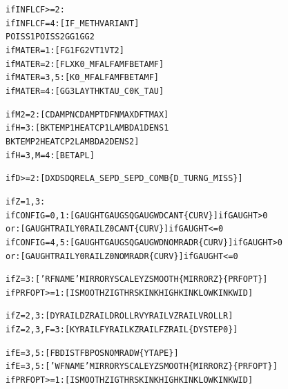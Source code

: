 \documentclass[12pt]{report}
\renewcommand{\magenta}[1]{}
\begin{document}
\begin{alltt}

if INFLCF>=2:
      if INFLCF=4:   [ IF\_METH  VARIANT               ]
                       POISS1  POISS2  GG1     GG2
\magenta{      if BOUND =1:   [ FLXZ                           ]
}      if MATER =1:   [ FG1     FG2       VT1     VT2  ]
      if MATER =2:   [ FLX     K0\_MF   ALFAMF  BETAMF ]
      if MATER =3,5: [         K0\_MF   ALFAMF  BETAMF ]
      if MATER =4:   [ GG3     LAYTHK  TAU\_C0  K\_TAU  ]


if M2=2:     [ CDAMPN   CDAMPT   DFNMAX   DFTMAX   ]
\magenta{if M3=2:     [ UTHRS    LPOW0    LPOW1           ]
}if H=3:      [ BKTEMP1  HEATCP1  LAMBDA1  DENS1           
               BKTEMP2  HEATCP2  LAMBDA2  DENS2    ]
if H=3, M=4: [ BETAPL                              ]


if D>=2:     [ DX    DS   DQREL   A\_SEP   D\_SEP   D\_COMB  \{D\_TURN   G\_MISS\} ]


if Z=1,3:
   if CONFIG=0,1:  [  GAUGHT   GAUGSQ   GAUGWD   CANT     \{CURV\} ]  if GAUGHT >  0
              or:  [  GAUGHT   RAILY0   RAILZ0   CANT     \{CURV\} ]  if GAUGHT <= 0
   if CONFIG=4,5:  [  GAUGHT   GAUGSQ   GAUGWD   NOMRADR  \{CURV\} ]  if GAUGHT >  0
              or:  [  GAUGHT   RAILY0   RAILZ0   NOMRADR  \{CURV\} ]  if GAUGHT <= 0

if Z=3:        [ 'RFNAME'  MIRRORY  SCALEYZ   SMOOTH  \{MIRRORZ\}  \{PRFOPT\} ]
if PRFOPT>=1:  [  ISMOOTH  ZIGTHRS  KINKHIGH  KINKLOW  KINKWID ]
\magenta{if PRFOPT>=2:  [  ERRHND   MAXOMIT  ]}
if Z=2,3:      [  DYRAIL   DZRAIL   DROLLR    VYRAIL   VZRAIL   VROLLR  ]
if Z=2,3, F=3: [  KYRAIL   FYRAIL   KZRAIL    FZRAIL  \{DYSTEP0\}         ]


if E=3,5:      [  FBDIST   FBPOS     NOMRADW  \{YTAPE\}  ]
if E=3,5:      [ 'WFNAME'  MIRRORY   SCALEYZ   SMOOTH  \{MIRRORZ\}  \{PRFOPT\} ]
if PRFOPT>=1:  [  ISMOOTH  ZIGTHRS   KINKHIGH  KINKLOW  KINKWID ]
\magenta{if PRFOPT>=2:  [  ERRHND   MAXOMIT  ]
}


\end{alltt}
\end{document}
